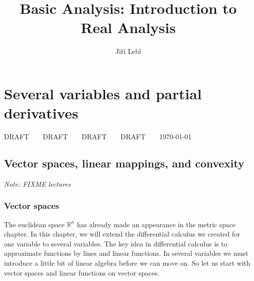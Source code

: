 \documentclass[12pt]{book}
\author{Ji\v{r}\'i Lebl}
\title{Basic Analysis: Introduction to Real Analysis}
\newcommand{\R}{{\mathbb{R}}}
\newcommand{\sectionnotes}[1]{\noindent \emph{Note: #1} \medskip \par}
\theoremstyle{plain}
\theoremstyle{remark}
\theoremstyle{definition}
\theoremstyle{exercise}
\theoremstyle{example}
\begin{document}
\setcounter{chapter}{0}
\label{rn:chapter}
\label{seq:chapter}
\label{lim:chapter}

\setcounter{chapter}{5}
\label{fs:chapter}
\label{ms:chapter}



\chapter{Several variables and partial derivatives} \label{pd:chapter}

\vspace*{-3in}
{\large DRAFT~~~~DRAFT~~~~DRAFT~~~~DRAFT~~~~\today}
\vspace*{2.508in}


\section{Vector spaces, linear mappings, and convexity}
\label{sec:vectorspaces}

\sectionnotes{FIXME lectures}

\subsection{Vector spaces}

The euclidean space $\R^n$ has already made an appearance in the metric
space chapter.  In this chapter, we will extend the differential calculus
we created for one variable to several variables.  The key idea in
differential calculus is to approximate functions by lines and linear
functions.  In several variables we must introduce a little bit of linear
algebra before we can move on.  So
let us start with vector spaces and linear functions on vector spaces.
\end{document}
